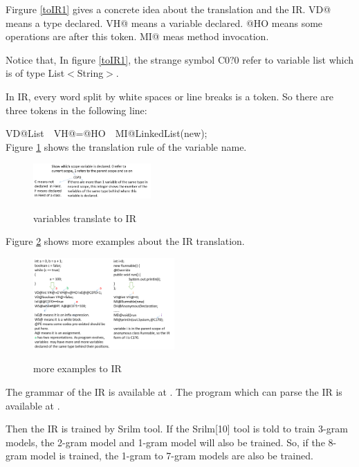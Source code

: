 \documentclass{sig-alternate-05-2015}
\begin{document}
Firgure \ref{toIR1} gives a concrete idea about the translation and the IR. VD@ means a type declared. VH@ means a variable declared.
@HO means some operations are after this token. MI@ meas method invocation.

Notice that, In figure \ref{toIR1}, the strange symbol C0$?$0 refer to variable list which is of type List$<$String$>$.

In IR, every word split by white spaces or line breaks is a token. So there are three tokens in the following line:

VD@List\quad\ \  VH@=@HO\quad\ \  MI@LinkedList(new);
\\

Figure \ref{vartoIR1} shows the translation rule of the variable name.
\\\begin{figure}[htbp]
  \centering
  \includegraphics[width=0.4\textwidth]{pics/variableIR.png}\\
  \vspace{-0.1cm}
  \caption{variables translate to IR}\label{vartoIR1}
\end{figure}

Figure \ref{moretoIR} shows more examples about the IR translation.
\\\begin{figure}[htbp]
  \centering
  \includegraphics[width=0.48\textwidth]{pics/moreexamplesIR.png}\\
  \vspace{-0.1cm}
  \caption{more examples to IR}\label{moretoIR}
\end{figure}

The grammar of the IR is available at \cite{irgrammar}. The program which can parse the IR is available at \cite{irparser}.

Then the IR is trained by Srilm\cite{stolcke2011srilm} tool. If the Srilm[10]
tool is told to train 3-gram models, the 2-gram model and 1-gram model will also be trained. So, if the 8-gram model is trained, the 1-gram to 7-gram models are also be trained.
\end{document}
